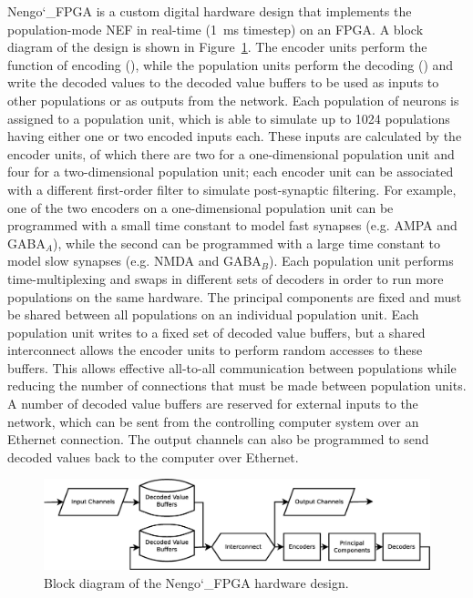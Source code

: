 \documentclass[english]{article}
\newcommand{\design}{Nengo\char`_FPGA}  %
\begin{document}
\design{} is a custom digital hardware design that implements the population-mode NEF in real-time (1~ms timestep) on an FPGA.
A block diagram of the design is shown in Figure~\ref{fig:system}.
The encoder units perform the function of encoding (), %
while the population units perform the decoding () %
and write the decoded values to the decoded value buffers
to be used as inputs to other populations or as outputs from the network.
Each population of neurons is assigned to a population unit, which is able to simulate up to 1024 populations
having either one or two encoded inputs each. These inputs are calculated by the encoder units,
of which there are two for a one-dimensional population unit and four for a two-dimensional population unit;
each encoder unit can be associated with a different first-order filter to simulate post-synaptic filtering.
For example, one of the two encoders on a one-dimensional population unit can be programmed with
a small time constant to model fast synapses (e.g. AMPA and GABA$_A$), while the second can be programmed
with a large time constant to model slow synapses (e.g. NMDA and GABA$_B$).
Each population unit performs time-multiplexing and swaps in different sets of decoders
in order to run more populations on the same hardware. The principal components are fixed and must be shared
between all populations on an individual population unit.
Each population unit writes to a fixed set of decoded value buffers, but a shared interconnect
allows the encoder units to perform random accesses to these buffers.
This allows effective all-to-all communication between populations while reducing the number of 
connections that must be made between population units.
A number of decoded value buffers are reserved for external inputs to the network,
which can be sent from the controlling computer system over an Ethernet connection.
The output channels can also be programmed to send decoded values back to the computer over Ethernet.

\begin{figure}
\centering

\includegraphics[width=6in]{system-block-diagram.eps}

\caption{Block diagram of the \design{} hardware design.}

\label{fig:system}
\end{figure}
\end{document}

